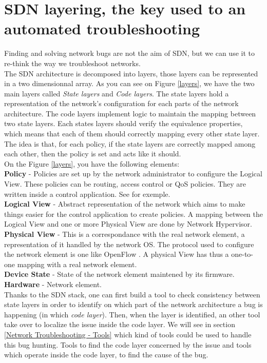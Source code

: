 \documentclass[10pt,article]{IEEEtran}
\begin{document}
\section{SDN layering, the key used to an automated troubleshooting}\label{layering}
Finding and solving network bugs are not the aim of SDN, but we can use it to re-think the way we troubleshoot networks.\\ The SDN architecture is decomposed into  layers, those layers can be represented in a two dimensionnal array. As you can see on Figure \ref{layers}, we have the two main layers called \textit{State layers} and \textit{Code layers}. The state layers hold a representation of the network's configuration for each parts of the network architecture. The code layers implement logic to maintain the mapping between two state layers. Each states layers should verify the equivalence properties, which means that each of them should correctly mapping every other state layer. The idea is that, for each policy, if the state layers are correctly mapped among each other, then the policy is  set and acts like it should.\\
On the Figure \ref{layers}, you have the following elements:\\
\textbf{Policy} - Policies are set up by the network administrator to configure the Logical View. These policies can be routing, access control or QoS policies. They are written inside a control application. See \cite{OpenStack_Quantum} for exemple.
\\
\textbf{Logical View} - Abstract representation of the network which aims to make things easier for the control application to create policies. A mapping between the Logical View and one or more Physical View are done by Network Hypervisor.\\
\textbf{Physical View} - This is a correspondance with the real network element, a representation of it handled by the network OS. The protocol used to configure the network element is one like OpenFlow \cite{OpenFlow}. A physical View has thus a one-to-one mapping with a real network element.
\\
\textbf{Device State} - State of the network element maintened by its firmware.
\\
\textbf{Hardware} - Network element. \\

Thanks to the SDN stack, one can first build a tool to check consistency between state layers in order to identify on which part of the network architecture a bug is happening (in which \textit{code layer}). Then, when the layer is identified, an other tool take over to localize the issue inside the code layer. We will see in section \ref{Network Troubleshooting - Tools} which kind of tools could be used to handle this bug hunting. Tools to find the code layer concerned by the issue and tools which operate inside the code layer, to find the cause of the bug.
\end{document}

